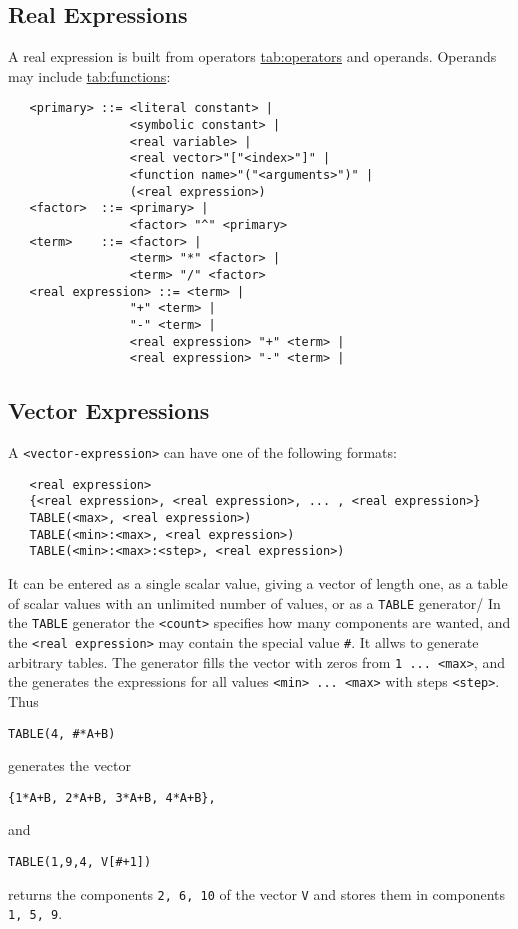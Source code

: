 \documentclass{article}
\newcommand{\tabref}[2]{\hyperref{#1}{#1 (see Table~}{)}{tab:#2}}
\begin{document}
\subsection{Real Expressions}
\label{sec:real}

A real expression is built from operators \tabref{operators}{operators} and 
operands. Operands may include
\tabref{functions}{functions}:

\begin{verbatim}
   <primary> ::= <literal constant> |
                 <symbolic constant> |
                 <real variable> |
                 <real vector>"["<index>"]" |
                 <function name>"("<arguments>")" |
                 (<real expression>)
   <factor>  ::= <primary> |
                 <factor> "^" <primary>
   <term>    ::= <factor> |
                 <term> "*" <factor> |
                 <term> "/" <factor>
   <real expression> ::= <term> |
                 "+" <term> |
                 "-" <term> |
                 <real expression> "+" <term> |
                 <real expression> "-" <term> |
\end{verbatim}

\subsection{Vector Expressions}
\label{sec:vect}
A \texttt{<vector-expression>} can have one of the following formats:
\begin{verbatim}
   <real expression>
   {<real expression>, <real expression>, ... , <real expression>}
   TABLE(<max>, <real expression>)
   TABLE(<min>:<max>, <real expression>)
   TABLE(<min>:<max>:<step>, <real expression>)
\end{verbatim}
It can be entered as a single scalar value,
giving a vector of length one,
as a table of scalar values with an unlimited number of values,
or as a \texttt{TABLE} generator/
In the \texttt{TABLE} generator the \texttt{<count>} specifies how
many components are wanted,
and the \texttt{<real expression>} may contain the special value
\texttt{\#}.
It allws to generate arbitrary tables.
The generator fills the vector with zeros from \verb'1 ... <max>',
and the generates the expressions for all values \verb'<min> ... <max>'
with steps \verb'<step>'.
Thus 
\begin{verbatim}
TABLE(4, #*A+B)
\end{verbatim} 
generates the vector 
\begin{verbatim}
{1*A+B, 2*A+B, 3*A+B, 4*A+B},
\end{verbatim}
and 
\begin{verbatim}
TABLE(1,9,4, V[#+1])
\end{verbatim} 
returns the components \verb'2, 6, 10' of the vector \texttt{V} and
stores them in components \verb'1, 5, 9'.
\end{document}
